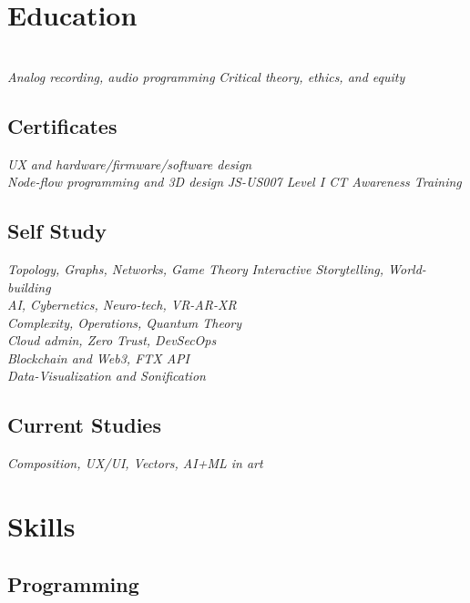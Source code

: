 \documentclass[]{quinnJarvisHollandLatex}
\begin{document}
\begin{minipage}[t]{0.33\textwidth}


\section{Education} 

\\
\textit{Analog recording, audio programming}
\textit{Critical theory, ethics, and equity} 
\subsection{Certificates}
\textit{UX and hardware/firmware/software design}\\
\textit{Node-flow programming and 3D design}
\textit{JS-US007 Level I CT Awareness Training}
\subsection{Self Study}
\textit{Topology, Graphs, Networks, Game Theory}
\textit{Interactive Storytelling, World-building}\\
\textit{AI, Cybernetics, Neuro-tech, VR-AR-XR}\\
\textit{Complexity, Operations, Quantum Theory}\\
\textit{Cloud admin, Zero Trust, DevSecOps}\\
\textit{Blockchain and Web3, FTX API}\\
\textit{Data-Visualization and Sonification}
\subsection{Current Studies} 
\textit{Composition, UX/UI, Vectors, AI+ML in art} 
\section{Skills}
\subsection{Programming}
\\
\\
   \\


\end{minipage}
\end{document}
